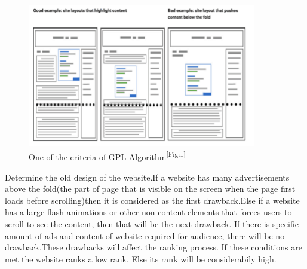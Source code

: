 \documentclass{fisatproject}
\begin{document}
\begin{figure}
	
	\includegraphics[width=10cm]{image/gpa.png}
	\caption{One of the criteria of GPL Algorithm\textsuperscript{[Fig:1]}}
	\label{fig1:gpa}
	
\end{figure}


Determine the old design of the website.If a website has many advertisements above the fold(the part of page that is visible on the screen when the page first loads before scrolling)then it is considered as the first drawback.Else if a website has a large flash animations or other
non-content elements that forces users to scroll to see the content, then that will be the next drawback. If there is specific amount of ads and content of website required for audience, there will be no drawback.These drawbacks will affect the ranking process. If these conditions are met the website ranks a low rank. Else its rank will be considerabily high.
\end{document}
